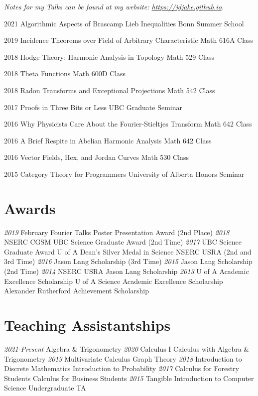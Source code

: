 \documentclass[a4paper]{cv-friggeri}
\begin{document}
\emph{Notes for my Talks can be found at my website: \href{https://jdjake.github.io}{https://jdjake.github.io}.}

\begin{entrylist}

\entry
{2021}
{Algorithmic Aspects of Brascamp Lieb Inequalities}
{Bonn Summer School}

\entry
{2019}
{Incidence Theorems over Field of Arbitrary Characteristic}
{Math 616A Class}
{}

\entry
{2018}
{Hodge Theory: Harmonic Analysis in Topology}
{Math 529 Class}
{}

\entry
{2018}
{Theta Functions}
{Math 600D Class}
{}

\entry
{2018}
{Radon Transforms and Exceptional Projections}
{Math 542 Class}
{}

\entry
{2017}
{Proofs in Three Bits or Less}
{UBC Graduate Seminar}
{}

\entry
{2016}
{Why Physicists Care About the Fourier-Stieltjes Transform}
{Math 642 Class}
{}

\entry
{2016}
{A Brief Respite in Abelian Harmonic Analysis}
{Math 642 Class}
{}

\entry
{2016}
{Vector Fields, Hex, and Jordan Curves}
{Math 530 Class}
{}

\entry
{2015}
{Category Theory for Programmers}
{University of Alberta Honors Seminar}
{}

\end{entrylist}

\begin{asidenotit}
\section{Awards}
\emph{2019}
February Fourier Talks Poster Presentation Award (2nd Place)
\emph{2018}
NSERC CGSM UBC
Science Graduate Award (2nd Time)
\emph{2017}
UBC Science
Graduate Award
U of A Dean's Silver Medal in Science
NSERC USRA
(2nd and 3rd Time)
\emph{2016}
Jason Lang Scholarship
(3rd Time)
\emph{2015}
Jason Lang Scholarship
(2nd Time)
\emph{2014}
NSERC USRA
Jason Lang Scholarship
\emph{2013}
U of A Academic Excellence Scholarship
U of A Science Academic Excellence Scholarship
Alexander Rutherford Achievement Scholarship
~
\section{Teaching Assistantships}
\emph{2021-Present}
Algebra \& Trigonometry
\emph{2020}
Calculus I
Calculus with Algebra \& Trigonometry
\emph{2019}
Multivariate Calculus
Graph Theory
\emph{2018}
Introduction to Discrete Mathematics
Introduction to Probability
\emph{2017}
Calculus for Forestry Students
Calculus for Business Students
\emph{2015}
Tangible Introduction to Computer Science Undergraduate TA
\end{asidenotit}
\end{document}
